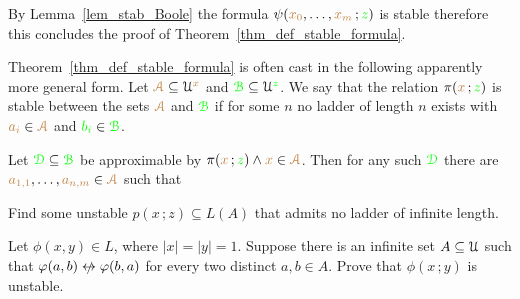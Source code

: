 


By Lemma~\ref{lem_stab_Boole} the formula $\psi({\color{brown} x_0},\dots,{\color{brown} x_m}\,;{\color{green} z})$ is stable therefore this concludes the proof of Theorem~\ref{thm_def_stable_formula}.

\begin{remark}\label{rem_sability_no_compactness}
  Theorem~\ref{thm_def_stable_formula} is often cast in the following  apparently more general form.
  Let ${\color{brown}\EuScript A}\subseteq\EuScript U^{\color{brown} x}$ and ${\color{green}\EuScript B}\subseteq\EuScript U^{\color{green} z}$.
  We say that the relation $\pi({\color{brown} x}\,;{\color{green} z})$ is stable between the sets ${\color{brown}\EuScript A}$ and ${\color{green}\EuScript B}$ if for some $n$ no ladder of length $n$ exists with ${\color{brown} a_i}\in{\color{brown}\EuScript A}$ and ${\color{green} b_i}\in{\color{green}\EuScript B}$.

  Let ${\color{green}\EuScript D}\subseteq{\color{green}\EuScript B}$ be approximable by $\pi({\color{brown} x}\,;{\color{green} z})\wedge {\color{brown}x}\in{\color{brown}\EuScript A}$.
  Then for any such ${\color{green}\EuScript D}$ there are ${\color{brown} a_{1,1}},\dots,{\color{brown} a_{n,m}}\in {\color{brown}\EuScript A}$ such that 
  
\end{remark} 


\begin{exercise}
  Find some unstable $p(x\,;z)\subseteq L(A)$ that admits no ladder of infinite length.
\end{exercise}

\begin{exercise}
  Let $\phi(x,y)\in  L$, where $|x|=|y|=1$.
  Suppose there is an infinite set $A\subseteq\EuScript U$ such that $\phi(a,b)\niff\phi(b,a)$ for every two distinct $a,b\in A$.
  Prove that $\phi(x\,;y)$ is unstable.
\end{exercise}


